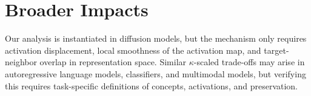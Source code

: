 \section{Broader Impacts}\label{app:impacts}
Our analysis is instantiated in diffusion models, but the mechanism only requires activation displacement, local smoothness of the activation map, and target-neighbor overlap in representation space. Similar $\kappa$-scaled trade-offs may arise in autoregressive language models, classifiers, and multimodal models, but verifying this requires task-specific definitions of concepts, activations, and preservation.
